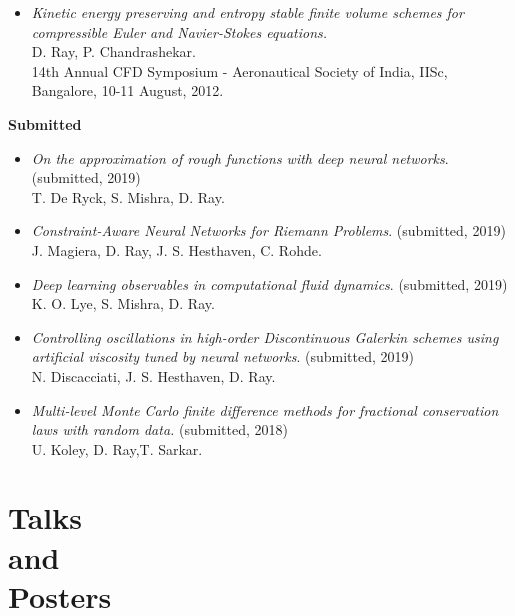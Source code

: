 \documentclass[margin]{res}
\begin{document}
\begin{resume}
\begin{itemize}
              \item {\it Kinetic energy preserving and entropy stable finite volume schemes for compressible Euler and Navier-Stokes equations.}\\
              D. Ray, P. Chandrashekar.\\
              14th Annual CFD Symposium - Aeronautical Society of India, IISc, Bangalore, 10-11 August, 2012.
             \end{itemize}

\textbf{Submitted}                
            \begin{itemize}           
              
               \item {\it On the approximation of rough functions with deep neural networks}. (submitted, 2019) \\
               T. De Ryck, S. Mishra, D. Ray.
              
              \item {\it Constraint-Aware Neural Networks for Riemann Problems}. (submitted, 2019) \\
               J. Magiera, D. Ray, J. S. Hesthaven, C. Rohde.
               
               \item {\it Deep learning observables in computational fluid dynamics}. (submitted, 2019) \\
               K. O. Lye, S. Mishra, D. Ray.
               
               \item {\it Controlling oscillations in high-order Discontinuous Galerkin schemes using artificial viscosity tuned by neural networks}. (submitted, 2019) \\
               N. Discacciati, J. S. Hesthaven, D. Ray.
           
              \item {\it Multi-level Monte Carlo finite difference methods for fractional conservation laws with random data.} (submitted, 2018)\\
              U. Koley, D. Ray,T. Sarkar.

             \end{itemize}

             
\section{Talks \\and \\Posters}
  

\end{resume}
\end{document}
